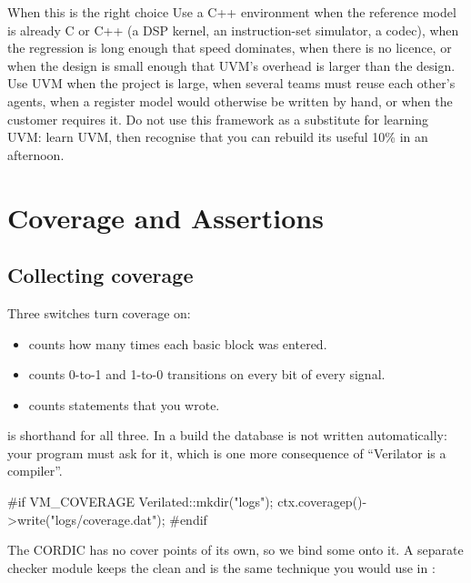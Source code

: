 \begin{notebox}{When this is the right choice}
Use a C++ environment when the reference model is already C or C++ (a DSP
kernel, an instruction-set simulator, a codec), when the regression is long
enough that speed dominates, when there is no licence, or when the design is
small enough that UVM's overhead is larger than the design. Use UVM when the
project is large, when several teams must reuse each other's agents, when a
register model would otherwise be written by hand, or when the customer
requires it. Do not use this framework as a substitute for learning UVM: learn
UVM, then recognise that you can rebuild its useful 10\% in an afternoon.
\end{notebox}

\section{Coverage and Assertions}
\label{sec:verilator:cov}

\subsection{Collecting coverage}

Three switches turn coverage on:

\begin{itemize}
  \item {} counts how many times each basic block was
        entered.
  \item {} counts 0-to-1 and 1-to-0 transitions on
        every bit of every signal.
  \item {} counts  statements that
        you wrote.
\end{itemize}

 is shorthand for all three. In a  build the
database is not written automatically: your program must ask for it, which is
one more consequence of ``Verilator is a compiler''.

\begin{cppcode}
#if VM_COVERAGE
    Verilated::mkdir("logs");
    ctx.coveragep()->write("logs/coverage.dat");
#endif
\end{cppcode}

The CORDIC has no cover points of its own, so we bind some onto it. A separate
checker module keeps the \RTL{} clean and is the same technique you would use
in :

